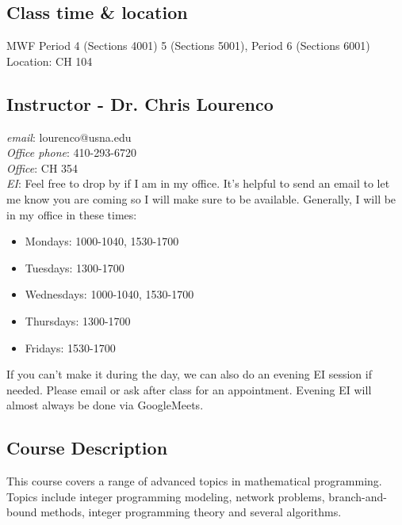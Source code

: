 \documentclass[letterpaper,hidelinks,oneside,11pt]{article}%
\begin{document}
\noindent{}
\subsection*{Class time \& location} 
MWF Period 4 (Sections 4001) 5 (Sections 5001), Period 6 (Sections 6001) \\ 

Location: CH 104


\subsection*{Instructor - Dr. Chris Lourenco}
\textit{email}: lourenco@usna.edu \\
\textit{Office phone}: 410-293-6720 \\
\textit{Office}: CH 354 \\
\textit{EI}: Feel free to drop by if I am in my office. It's helpful to send an email to let me know you are coming so I will make sure to be available. Generally, I will be in my office in these times:
	\begin{itemize}
	\item Mondays: 1000-1040, 1530-1700
	\item Tuesdays: 1300-1700
	\item Wednesdays: 1000-1040, 1530-1700
	\item Thursdays: 1300-1700
	\item Fridays: 1530-1700
	\end{itemize}

If you can't make it during the day, we can also do an evening EI session if needed. Please email or ask after class for an appointment. Evening EI will almost always be done via GoogleMeets.


\subsection*{Course Description}

This course covers a range of advanced topics in mathematical programming. Topics include integer programming modeling, network problems, branch-and-bound methods, integer programming theory and several algorithms.
\end{document}
